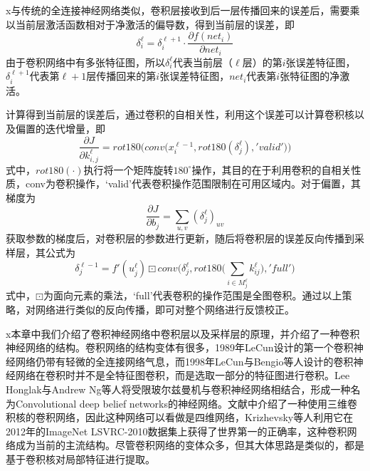 x与传统的全连接神经网络类似，卷积层接收到后一层传播回来的误差后，需要乘以当前层激活函数相对于净激活的偏导数，得到当前层的误差，即
\begin{equation}
\delta^\ell_i = \delta^{\ell + 1}_i \cdot \frac{\partial f(net_i)}{\partial net_i}
\end{equation}
由于卷积网络中有多张特征图，所以$\delta^\ell_i $代表当前层（$\ell$层）的第$i$张误差特征图，$\delta^{\ell + 1}_i$代表第$\ell + 1$层传播回来的第$i$张误差特征图，$net_i$代表第$i$张特征图的净激活。

计算得到当前层的误差后，通过卷积的自相关性，利用这个误差可以计算卷积核以及偏置的迭代增量，即
\begin{equation}
\frac{\partial J}{\partial k_{i, j}^\ell} =rot180\bigg(conv\Big(x_i^{\ell-1}, rot180(\delta_j^\ell),'valid' \Big)\bigg) 
\end{equation}
式中，$rot180( \cdot )$执行将一个矩阵旋转$180^\circ$操作，其目的在于利用卷积的自相关性质，conv为卷积操作，‘valid’代表卷积操作范围限制在可用区域内。对于偏置，其梯度为
\begin{equation}
\frac{\partial J}{\partial b_j} = \sum\limits_{u, v} (\delta_j^\ell)_{uv}
\end{equation}
获取参数的梯度后，对卷积层的参数进行更新，随后将卷积层的误差反向传播到采样层，其公式为
\begin{equation}
\delta_j^{\ell -1} = f'(u_j^\ell) \boxdot conv\bigg(\delta_j^\ell, rot180\Big(\sum\limits_{i\in M_j^\ell} k_{ij}^\ell\Big), 'full' \bigg)
\end{equation}
式中，$\boxdot$为面向元素的乘法，‘full’代表卷积的操作范围是全图卷积。通过以上策略，对网络进行类似的反向传播，即可对整个网络进行反馈校正。



x本章中我们介绍了卷积神经网络中卷积层以及采样层的原理，并介绍了一种卷积神经网络的结构。卷积网络的结构变体有很多，1989年LeCun设计的第一个卷积神经网络仍带有轻微的全连接网络气息，而1998年LeCun与Bengio等人设计的卷积神经网络在卷积时并不是全特征图卷积，而是选取一部分的特征图进行卷积。Lee Honglak与Andrew Ng等人将受限玻尔兹曼机与卷积神经网络相结合，形成一种名为Convolutional deep belief networks的神经网络。文献\cite{krizhevsky2012imagenet}中介绍了一种使用三维卷积核的卷积网络，因此这种网络可以看做是四维网络，Krizhevsky等人利用它在2012年的ImageNet LSVRC-2010数据集上获得了世界第一的正确率，这种卷积网络成为当前的主流结构。尽管卷积网络的变体众多，但其大体思路是类似的，都是基于卷积核对局部特征进行提取。







